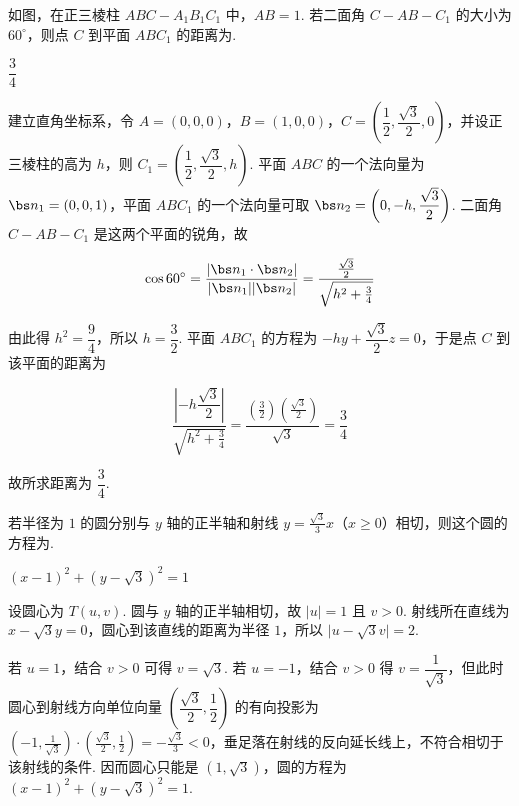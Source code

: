 \begin{problem}
如图，在正三棱柱 \(ABC - A_{1}B_{1}C_{1}\) 中，\(AB = 1\). 若二面角 \(C - AB - C_{1}\) 的大小为 \(60^{\circ}\)，则点 \(C\) 到平面 \(ABC_{1}\) 的距离为\fillinblank{}.

\end{problem}

\begin{answer}
\(\dfrac{3}{4}\)
\end{answer}

\begin{solution}
建立直角坐标系，令 \(A=(0,0,0)\)，\(B=(1,0,0)\)，\(C=\left(\dfrac12,\dfrac{\sqrt3}{2},0\right)\)，并设正三棱柱的高为 \(h\)，则 \(C_1=\left(\dfrac12,\dfrac{\sqrt3}{2},h\right)\). 平面 \(ABC\) 的一个法向量为 \(\bs n_1=(0,0,1)\)，平面 \(ABC_1\) 的一个法向量可取 \(\bs n_2=\left(0,-h,\dfrac{\sqrt3}{2}\right)\). 二面角 \(C-AB-C_1\) 是这两个平面的锐角，故

\[
\cos60^{\circ}=\frac{\lvert\bs n_1\cdot\bs n_2\rvert}{\lvert\bs n_1\rvert\lvert\bs n_2\rvert}=\frac{\frac{\sqrt3}{2}}{\sqrt{h^2+\frac{3}{4}}}
\]

由此得 \(h^2=\dfrac94\)，所以 \(h=\dfrac32\). 平面 \(ABC_1\) 的方程为 \(-hy+\dfrac{\sqrt3}{2}z=0\)，于是点 \(C\) 到该平面的距离为

\[
\frac{\left|-h\dfrac{\sqrt3}{2}\right|}{\sqrt{h^2+\frac{3}{4}}}=\frac{(\frac{3}{2})(\frac{\sqrt3}{2})}{\sqrt3}=\frac34
\]

故所求距离为 \(\dfrac34\).
\end{solution}

\begin{problem}
若半径为 \(1\) 的圆分别与 \(y\) 轴的正半轴和射线 \(y = \frac{\sqrt{3}}{3}x\)（\(x \geqslant 0\)）相切，则这个圆的方程为\fillinblank{}.
\end{problem}

\begin{answer}
\((x-1)^2+(y-\sqrt{3})^2=1\)
\end{answer}

\begin{solution}
设圆心为 \(T(u,v)\). 圆与 \(y\) 轴的正半轴相切，故 \(\lvert u\rvert=1\) 且 \(v>0\). 射线所在直线为 \(x-\sqrt3y=0\)，圆心到该直线的距离为半径 \(1\)，所以 \(\lvert u-\sqrt3v\rvert=2\).

若 \(u=1\)，结合 \(v>0\) 可得 \(v=\sqrt3\). 若 \(u=-1\)，结合 \(v>0\) 得 \(v=\dfrac1{\sqrt3}\)，但此时圆心到射线方向单位向量 \(\left(\dfrac{\sqrt3}{2},\dfrac12\right)\) 的有向投影为 \((-1,\frac{1}{\sqrt3})\cdot(\frac{\sqrt3}{2},\frac{1}{2})=-\frac{\sqrt3}{3}<0\)，垂足落在射线的反向延长线上，不符合相切于该射线的条件. 因而圆心只能是 \((1,\sqrt3)\)，圆的方程为 \((x-1)^2+(y-\sqrt3)^2=1\).
\end{solution}

